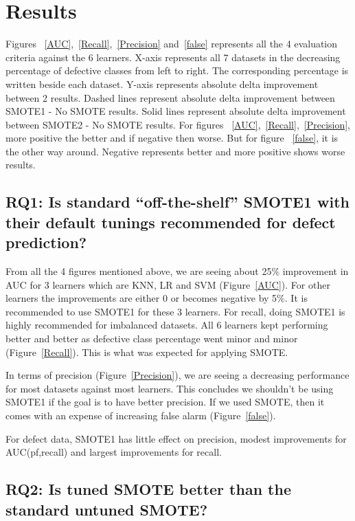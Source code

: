 \section{Results}
\label{sect:results}
Figures ~\ref{AUC},~\ref{Recall},~\ref{Precision} and~\ref{false} represents all the 4 evaluation criteria against the 6 learners. X-axis represents all 7 datasets in the decreasing percentage of defective classes from left to right. The corresponding percentage is written beside each dataset. Y-axis represents absolute delta improvement between 2 results. Dashed lines represent absolute delta improvement between SMOTE1 - No SMOTE results. Solid lines represent absolute delta improvement between SMOTE2 - No SMOTE results. For figures ~\ref{AUC},~\ref{Recall},~\ref{Precision}, more positive the better and if negative then worse. But for figure ~\ref{false}, it is the other way around. Negative represents better and more positive shows worse results.

\subsection{\textbf{RQ1: Is standard ``off-the-shelf'' SMOTE1 with their default tunings recommended for defect prediction?}}

From all the 4 figures mentioned above, we are seeing about 25\% improvement in AUC for 3 learners which are KNN, LR and SVM (Figure~\ref{AUC}). For other learners the improvements are either 0 or becomes negative by 5\%. It is recommended to use SMOTE1 for these 3 learners. For recall, doing SMOTE1 is highly recommended for imbalanced datasets. All 6 learners kept performing better and better as defective class percentage went minor and minor (Figure~\ref{Recall}). This is what was expected for applying SMOTE.

In terms of precision (Figure~\ref{Precision}), we are seeing a decreasing performance for most datasets against most learners. This concludes we shouldn't be using SMOTE1 if the goal is to have better precision. If we used SMOTE, then it comes with an expense of increasing false alarm (Figure~\ref{false}).

\begin{lesson}
    For defect data, SMOTE1 has little effect on 
 precision, modest improvements for AUC(pf,recall) and largest improvements for recall.
\end{lesson}

\subsection{\textbf{RQ2: Is tuned SMOTE better than the standard untuned SMOTE?}}


